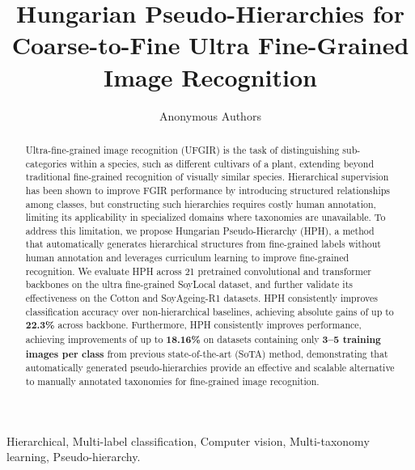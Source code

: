 \documentclass[conference,a4paper]{IEEEtran}
\begin{document}
\title{Hungarian Pseudo-Hierarchies for Coarse-to-Fine Ultra Fine-Grained Image Recognition}

\author{Anonymous Authors}

\maketitle

\begin{abstract}
Ultra-fine-grained image recognition (UFGIR) is the task of distinguishing sub-categories within a species, such as different cultivars of a plant, extending beyond traditional fine-grained recognition of visually similar species. Hierarchical supervision has been shown to improve FGIR performance by introducing structured relationships among classes, but constructing such hierarchies requires costly human annotation, limiting its applicability in specialized domains where taxonomies are unavailable. To address this limitation, we propose Hungarian Pseudo-Hierarchy (HPH), a method that automatically generates hierarchical structures from fine-grained labels without human annotation and leverages curriculum learning to improve fine-grained recognition. We evaluate HPH across 21 pretrained convolutional and transformer backbones on the ultra fine-grained SoyLocal dataset, and further validate its effectiveness on the Cotton and SoyAgeing-R1 datasets. HPH consistently improves classification accuracy over non-hierarchical baselines, achieving absolute gains of up to \textbf{22.3\%} across backbone. Furthermore, HPH consistently improves performance, achieving improvements of up to \textbf{18.16\%} on datasets containing only \textbf{3--5 training images per class} from previous state-of-the-art (SoTA) method, demonstrating that automatically generated pseudo-hierarchies provide an effective and scalable alternative to manually annotated taxonomies for fine-grained image recognition.
\end{abstract}

\begin{IEEEkeywords}
Hierarchical, Multi-label classification, Computer vision, Multi-taxonomy learning, Pseudo-hierarchy.
\end{IEEEkeywords}
\end{document}

